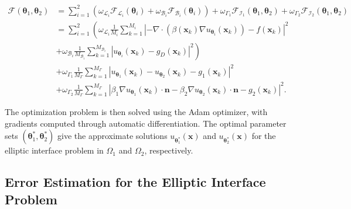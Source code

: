 \documentclass{article}
\begin{document}
\begin{equation}
    \begin{aligned}
\mathcal{F}(\boldsymbol{\theta}_1, \boldsymbol{\theta}_2) &= \sum_{i=1}^{2} \left(\omega_{\mathcal{L}_i} \mathcal{F}_{\mathcal{L}_i}(\boldsymbol{\theta}_i) + \omega_{\mathcal{B}_i} \mathcal{F}_{\mathcal{B}_i}(\boldsymbol{\theta}_i) \right)+ \omega_{\Gamma_1} \mathcal{F}_{\mathcal{I}_1}(\boldsymbol{\theta}_1, \boldsymbol{\theta}_2) + \omega_{\Gamma_2} \mathcal{F}_{\mathcal{I}_2}(\boldsymbol{\theta}_1, \boldsymbol{\theta}_2) \\
&= \sum_{i=1}^{2} \left(\omega_{\mathcal{L}_i} \frac{1}{M_{i}} \sum_{k=1}^{M_{i}} \left|-\nabla \cdot (\beta(\boldsymbol{x}_k) \nabla u_{\boldsymbol{\theta}_i}(\boldsymbol{x}_k)) - f(\boldsymbol{x}_k)\right|^2 \right.\\
&\left.+ \omega_{\mathcal{B}_i} \frac{1}{M_{\mathcal{B}_i}} \sum_{k=1}^{M_{\mathcal{B}_i}} \left|u_{\boldsymbol{\theta}_i}(\boldsymbol{x}_k) - g_D(\boldsymbol{x}_k)\right|^2 \right)\\
&+ \omega_{\Gamma_1} \frac{1}{M_{\Gamma}} \sum_{k=1}^{M_{\Gamma}} \left|u_{\boldsymbol{\theta}_1}(\boldsymbol{x}_k) - u_{\boldsymbol{\theta}_2}(\boldsymbol{x}_k) - g_1(\boldsymbol{x}_k)\right|^2 \\
&+ \omega_{\Gamma_2} \frac{1}{M_{\Gamma}} \sum_{k=1}^{M_{\Gamma}} \left|\beta_1 \nabla u_{\boldsymbol{\theta}_1}(\boldsymbol{x}_k) \cdot \boldsymbol{n} - \beta_2 \nabla u_{\boldsymbol{\theta}_2}(\boldsymbol{x}_k) \cdot \boldsymbol{n} - g_2(\boldsymbol{x}_k)\right|^2.
\end{aligned}
\end{equation}

The optimization problem is then solved using the Adam optimizer, with gradients computed through automatic differentiation. The optimal parameter sets $(\boldsymbol{\theta}_1^*, \boldsymbol{\theta}_2^*)$ give the approximate solutions $u_{\boldsymbol{\theta}_1^*}(\boldsymbol{x})$ and $u_{\boldsymbol{\theta}_2^*}(\boldsymbol{x})$ for the elliptic interface problem in $\Omega_1$ and $\Omega_2$, respectively.

\subsection{Error Estimation for the Elliptic Interface Problem}
\end{document}
